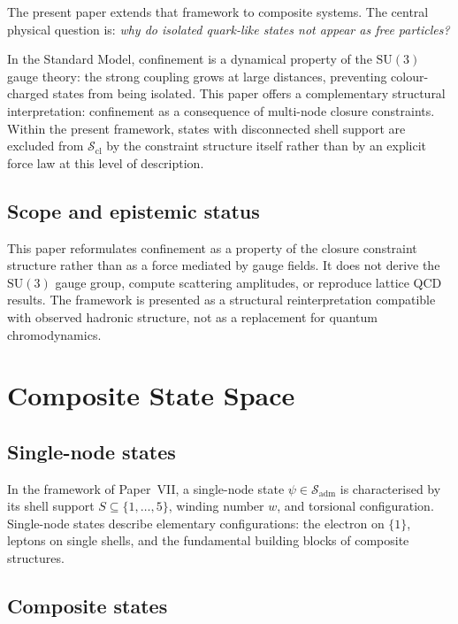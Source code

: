 \documentclass[12pt]{article}
\newcommand{\Sadm}{\mathcal{S}_{\mathrm{adm}}}
\newcommand{\Scl}{\mathcal{S}_{\mathrm{cl}}}
\begin{document}
The present paper extends that framework to composite systems. The central physical question is: \textit{why do isolated quark-like states not appear as free particles?}

In the Standard Model, confinement is a dynamical property of the $\mathrm{SU}(3)$ gauge theory: the strong coupling grows at large distances, preventing colour-charged states from being isolated. This paper offers a complementary structural interpretation: confinement as a consequence of multi-node closure constraints. Within the present framework, states with disconnected shell support are excluded from $\Scl$ by the constraint structure itself rather than by an explicit force law at this level of description.

\subsection*{Scope and epistemic status}

This paper reformulates confinement as a property of the closure constraint structure rather than as a force mediated by gauge fields. It does not derive the $\mathrm{SU}(3)$ gauge group, compute scattering amplitudes, or reproduce lattice QCD results. The framework is presented as a structural reinterpretation compatible with observed hadronic structure, not as a replacement for quantum chromodynamics.

\section{Composite State Space}\label{sec:composite}

\subsection{Single-node states}

In the framework of Paper~VII, a single-node state $\psi \in \Sadm$ is characterised by its shell support $S \subseteq \{1, \ldots, 5\}$, winding number $w$, and torsional configuration. Single-node states describe elementary configurations: the electron on $\{1\}$, leptons on single shells, and the fundamental building blocks of composite structures.

\subsection{Composite states}
\end{document}
